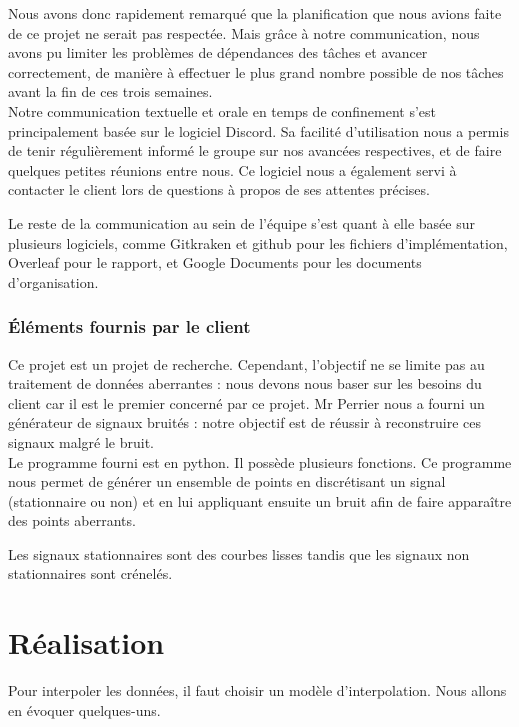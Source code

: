 \documentclass[a4paper,12pt]{article} %
\begin{document}
        Nous avons donc rapidement remarqué que la planification que nous avions faite de ce projet ne serait pas respectée. Mais grâce à notre communication, nous avons pu limiter les problèmes de dépendances des tâches et avancer correctement, de manière à effectuer le plus grand nombre possible de nos tâches avant la fin de ces trois semaines.\\
        
        Notre communication textuelle et orale en temps de confinement s'est principalement basée sur le logiciel Discord. Sa facilité d'utilisation nous a permis de tenir régulièrement informé le groupe sur nos avancées respectives, et de faire quelques petites réunions entre nous. Ce logiciel nous a également servi à contacter le client lors de questions à propos de ses attentes précises.
        
        Le reste de la communication au sein de l'équipe s'est quant à elle basée sur plusieurs logiciels, comme Gitkraken \cite{gitkraken} et github \cite{github} pour les fichiers d'implémentation, Overleaf \cite{overleaf} pour le rapport, et Google Documents \cite{drive} pour les documents d'organisation.
        
	\section{Éléments fournis par le client}
	    Ce projet est un projet de recherche. Cependant, l'objectif ne se limite pas au traitement de données aberrantes : nous devons nous baser sur les besoins du client car il est le premier concerné par ce projet. Mr Perrier nous a fourni un générateur de signaux bruités : notre objectif est de réussir à reconstruire ces signaux malgré le bruit. \\
	    
	    Le programme fourni est en python. Il possède plusieurs fonctions. Ce programme nous permet de générer un ensemble de points en discrétisant un signal (stationnaire  ou non) et en lui appliquant ensuite un bruit afin de faire apparaître des points aberrants.
	    
	    Les signaux stationnaires sont des courbes lisses tandis que les signaux non stationnaires sont crénelés. 



\renewcommand\partname{}
\part{Réalisation}
	Pour interpoler les données, il faut choisir un modèle d'interpolation. Nous allons en évoquer quelques-uns. 
	
\end{document}
